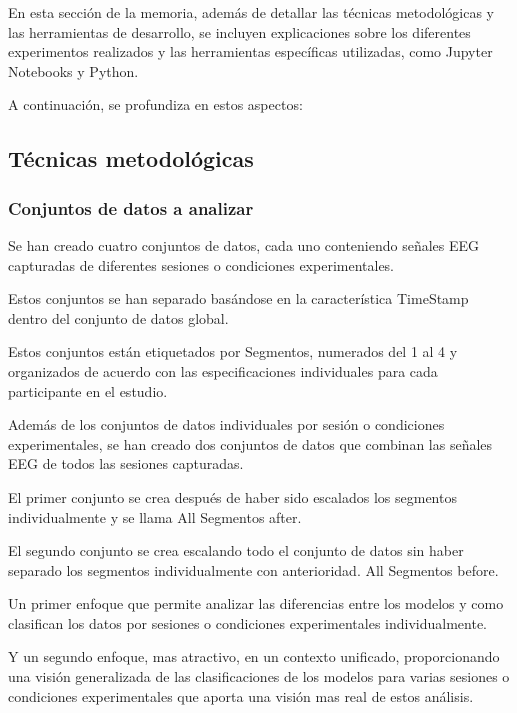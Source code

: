 
En esta sección de la memoria, además de detallar las técnicas metodológicas y las herramientas de desarrollo, se incluyen explicaciones sobre los diferentes experimentos realizados y las herramientas específicas utilizadas, como Jupyter Notebooks y Python. 

A continuación, se profundiza en estos aspectos:


\subsection{Técnicas metodológicas}



\subsubsection{Conjuntos de datos a analizar}

Se han creado cuatro conjuntos de datos, cada uno conteniendo señales EEG capturadas de diferentes sesiones o condiciones experimentales.

Estos conjuntos se han separado basándose en la característica TimeStamp dentro del conjunto de datos global.

Estos conjuntos están etiquetados por Segmentos, numerados del 1 al 4 y organizados de acuerdo con las especificaciones individuales para cada participante en el estudio.


Además de los conjuntos de datos individuales por sesión o condiciones experimentales, se han creado dos conjuntos de datos que combinan las señales EEG de todos las sesiones capturadas.

El primer conjunto se crea después de haber sido escalados los segmentos individualmente y se llama All Segmentos after.

El segundo conjunto se crea escalando todo el conjunto de datos sin haber separado los segmentos individualmente con anterioridad. All Segmentos before.


Un primer enfoque que permite analizar las diferencias entre los modelos y como clasifican los datos por sesiones o condiciones experimentales individualmente.

Y un segundo enfoque, mas atractivo, en un contexto unificado, proporcionando una visión generalizada de las clasificaciones de los modelos para varias sesiones o condiciones experimentales que aporta una visión mas real de estos análisis.

